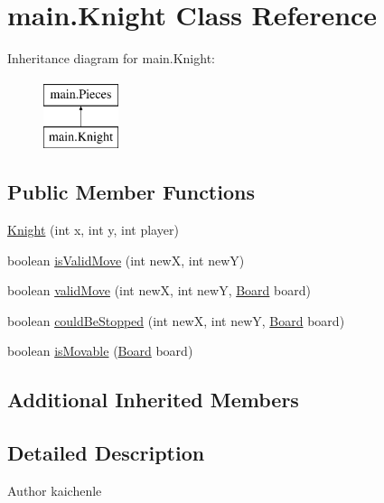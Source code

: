 \hypertarget{classmain_1_1_knight}{}\section{main.\+Knight Class Reference}
\label{classmain_1_1_knight}
Inheritance diagram for main.\+Knight\+:\begin{figure}[H]
\begin{center}
\leavevmode
\includegraphics[height=2.000000cm]{classmain_1_1_knight}
\end{center}
\end{figure}
\subsection*{Public Member Functions}
\begin{DoxyCompactItemize}
\item 
\mbox{\hyperlink{classmain_1_1_knight_a57e9a5ff0ded3f5636fccf2325616837}{Knight}} (int x, int y, int player)
\item 
boolean \mbox{\hyperlink{classmain_1_1_knight_a65b314ba3dee673545222a60938d41ef}{is\+Valid\+Move}} (int newX, int newY)
\item 
boolean \mbox{\hyperlink{classmain_1_1_knight_a883345babf8f5cf09611ac25857939c6}{valid\+Move}} (int newX, int newY, \mbox{\hyperlink{classmain_1_1_board}{Board}} board)
\item 
boolean \mbox{\hyperlink{classmain_1_1_knight_a350832c72d961a9ddf0c4e4c1dcb4fae}{could\+Be\+Stopped}} (int newX, int newY, \mbox{\hyperlink{classmain_1_1_board}{Board}} board)
\item 
boolean \mbox{\hyperlink{classmain_1_1_knight_a1f2fc54af96bddbd4e06f1860f8c4a1e}{is\+Movable}} (\mbox{\hyperlink{classmain_1_1_board}{Board}} board)
\end{DoxyCompactItemize}
\subsection*{Additional Inherited Members}


\subsection{Detailed Description}
\begin{DoxyAuthor}{Author}
kaichenle 
\end{DoxyAuthor}


